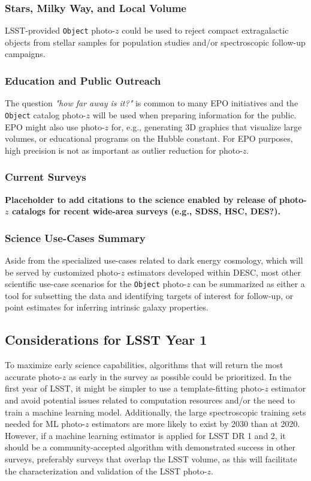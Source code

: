\documentclass[DM,lsstdraft,toc]{lsstdoc}
\begin{document}
\subsubsection{Stars, Milky Way, and Local Volume}
LSST-provided {\tt Object} photo-$z$ could be used to reject compact extragalactic objects from stellar samples for population studies and/or spectroscopic follow-up campaigns.

\subsubsection{Education and Public Outreach}
The question {\it "how far away is it?"} is common to many EPO initiatives and the {\tt Object} catalog photo-$z$ will be used when preparing information for the public.
EPO might also use photo-$z$ for, e.g., generating 3D graphics that visualize large volumes, or educational programs on the Hubble constant.
For EPO purposes, high precision is not as important as outlier reduction for photo-$z$.

\subsubsection{Current Surveys}
{\bf Placeholder to add citations to the science enabled by release of photo-$z$ catalogs for recent wide-area surveys (e.g., SDSS, HSC, DES?).}

\subsubsection{Science Use-Cases Summary}
Aside from the specialized use-cases related to dark energy cosmology, which will be served by customized photo-$z$ estimators developed within DESC, most other scientific use-case scenarios for the {\tt Object} photo-$z$ can be summarized as either a tool for subsetting the data and identifying targets of interest for follow-up, or point estimates for inferring intrinsic galaxy properties.

\subsection{Considerations for LSST Year 1}\label{ssec:use_LOY1}

To maximize early science capabilities, algorithms that will return the most accurate photo-$z$ as early in the survey as possible could be prioritized.
In the first year of LSST, it might be simpler to use a template-fitting photo-$z$ estimator and avoid potential issues related to computation resources and/or the need to train a machine learning model.
Additionally, the large spectroscopic training sets needed for ML photo-$z$ estimators are more likely to exist by 2030 than at 2020.
However, if a machine learning estimator is applied for LSST DR 1 and 2, it should be a community-accepted algorithm with demonstrated success in other surveys, preferably surveys that overlap the LSST volume, as this will facilitate the characterization and validation of the LSST photo-$z$. 
\end{document}
